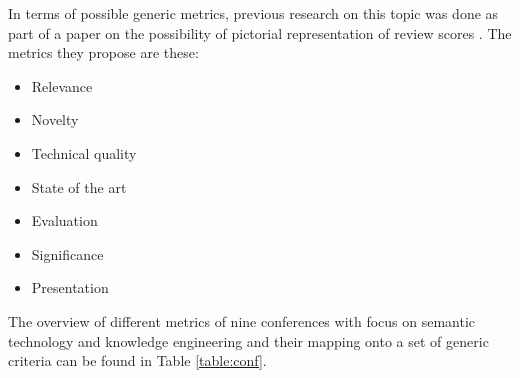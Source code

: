  
In terms of possible generic metrics, previous research on this topic was done as part of a paper on the possibility of pictorial representation of review scores \cite{svatek_strossa}. The metrics they propose are these:
\begin{itemize}
    \item Relevance
    \item Novelty
    \item Technical quality
    \item State of the art
    \item Evaluation
    \item Significance
    \item Presentation
\end{itemize}
The overview of different metrics of nine conferences with focus on semantic technology and knowledge engineering and their mapping onto a set of generic criteria can be found in Table \ref{table:conf}.
